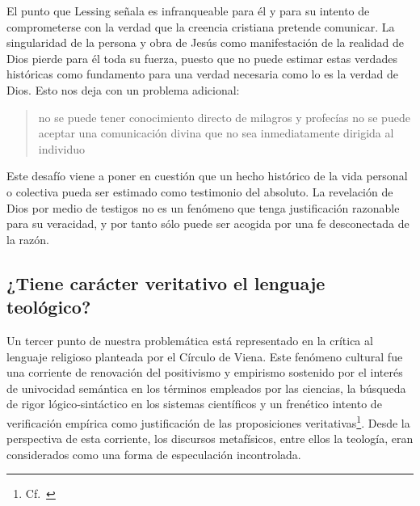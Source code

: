 El punto que Lessing señala es infranqueable para él y para su intento de comprometerse con la verdad que la creencia cristiana pretende comunicar. La singularidad de la persona y obra de Jesús como manifestación de la realidad de Dios pierde para él toda su fuerza, puesto que no puede estimar estas verdades históricas como fundamento para una verdad necesaria como lo es la verdad de Dios. Esto nos deja con un problema adicional: \blockquote[{\cite[294]{prades2015testimonio}}]{no se puede tener conocimiento directo de milagros y profecías \textelp{} no se puede aceptar una comunicación divina que no sea inmediatamente dirigida al individuo}.

Este desafío viene a poner en cuestión que un hecho histórico de la vida personal o colectiva pueda ser estimado como testimonio del absoluto. La revelación de Dios por medio de testigos no es un fenómeno que tenga justificación razonable para su veracidad, y por tanto sólo puede ser acogida por una fe desconectada de la razón.

\subsection{¿Tiene carácter veritativo el lenguaje teológico?}

Un tercer punto de nuestra problemática está representado en la crítica al lenguaje religioso planteada por el Círculo de Viena. Este fenómeno cultural fue una corriente de renovación del positivismo y empirismo sostenido por el interés de univocidad semántica en los términos empleados por las ciencias, la búsqueda de rigor lógico-sintáctico en los sistemas científicos y un frenético intento de verificación empírica como justificación de las proposiciones veritativas\footnote{Cf.~\cite[152]{dominguez2009at}}. Desde la perspectiva de esta corriente, los discursos metafísicos, entre ellos la teología, eran considerados como una forma de especulación incontrolada.

